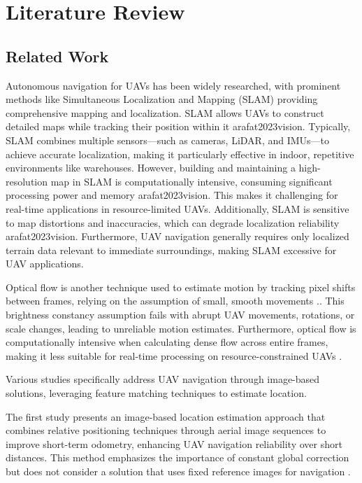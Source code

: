 
\chapter{Literature Review}



\section{Related Work}


Autonomous navigation for UAVs has been widely researched, with prominent methods like Simultaneous Localization and Mapping (SLAM) providing comprehensive mapping and localization. SLAM allows UAVs to construct detailed maps while tracking their position within it {arafat2023vision}. Typically, SLAM combines multiple sensors—such as cameras, LiDAR, and IMUs—to achieve accurate localization, making it particularly effective in indoor, repetitive environments like warehouses. However, building and maintaining a high-resolution map in SLAM is computationally intensive, consuming significant processing power and memory {arafat2023vision}. This makes it challenging for real-time applications in resource-limited UAVs. Additionally, SLAM is sensitive to map distortions and inaccuracies, which can degrade localization reliability {arafat2023vision}. Furthermore, UAV navigation generally requires only localized terrain data relevant to immediate surroundings, making SLAM excessive for UAV applications.

Optical flow is another technique used to estimate motion by tracking pixel shifts between frames, relying on the assumption of small, smooth movements \cite{sim2002integrated}.. This brightness constancy assumption fails with abrupt UAV movements, rotations, or scale changes, leading to unreliable motion estimates. Furthermore, optical flow is computationally intensive when calculating dense flow across entire frames, making it less suitable for real-time processing on resource-constrained UAVs \cite{barnum2003practical}.

Various studies specifically address UAV navigation through image-based solutions, leveraging feature matching techniques to estimate location.

The first study presents an image-based location estimation approach that combines relative positioning techniques through aerial image sequences to improve short-term odometry, enhancing UAV navigation reliability over short distances. This method emphasizes the importance of constant global correction but does not consider a solution that uses fixed reference images for navigation \cite{sim2002integrated}.


